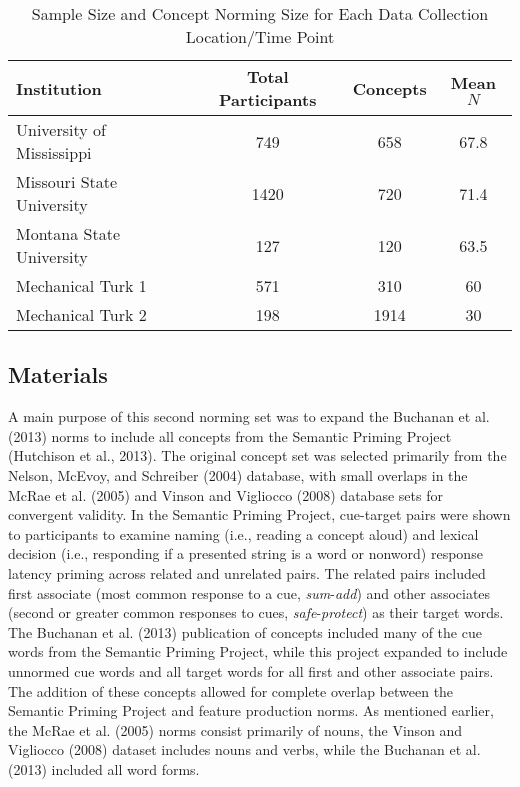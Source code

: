\documentclass[english,,man]{apa6}
\theoremstyle{definition}
\theoremstyle{definition}
\theoremstyle{definition}
\theoremstyle{remark}
\begin{document}
\begin{table}[tbp]
\begin{center}
\begin{threeparttable}
\caption{\label{tab:part-table}Sample Size and Concept Norming Size for Each Data Collection Location/Time Point}
\begin{tabular}{lccc}
\toprule
Institution & Total Participants & Concepts & Mean $N$\\
\midrule
University of Mississippi & 749 & 658 & 67.8\\
Missouri State University & 1420 & 720 & 71.4\\
Montana State University & 127 & 120 & 63.5\\
Mechanical Turk 1 & 571 & 310 & 60\\
Mechanical Turk 2 & 198 & 1914 & 30\\
\bottomrule
\end{tabular}
\end{threeparttable}
\end{center}
\end{table}

\subsection{Materials}\label{materials}

A main purpose of this second norming set was to expand the Buchanan et
al. (2013) norms to include all concepts from the Semantic Priming
Project (Hutchison et al., 2013). The original concept set was selected
primarily from the Nelson, McEvoy, and Schreiber (2004) database, with
small overlaps in the McRae et al. (2005) and Vinson and Vigliocco
(2008) database sets for convergent validity. In the Semantic Priming
Project, cue-target pairs were shown to participants to examine naming
(i.e., reading a concept aloud) and lexical decision (i.e., responding
if a presented string is a word or nonword) response latency priming
across related and unrelated pairs. The related pairs included first
associate (most common response to a cue, \emph{sum}-\emph{add}) and
other associates (second or greater common responses to cues,
\emph{safe}-\emph{protect}) as their target words. The Buchanan et al.
(2013) publication of concepts included many of the cue words from the
Semantic Priming Project, while this project expanded to include
unnormed cue words and all target words for all first and other
associate pairs. The addition of these concepts allowed for complete
overlap between the Semantic Priming Project and feature production
norms. As mentioned earlier, the McRae et al. (2005) norms consist
primarily of nouns, the Vinson and Vigliocco (2008) dataset includes
nouns and verbs, while the Buchanan et al. (2013) included all word
forms.
\end{document}

